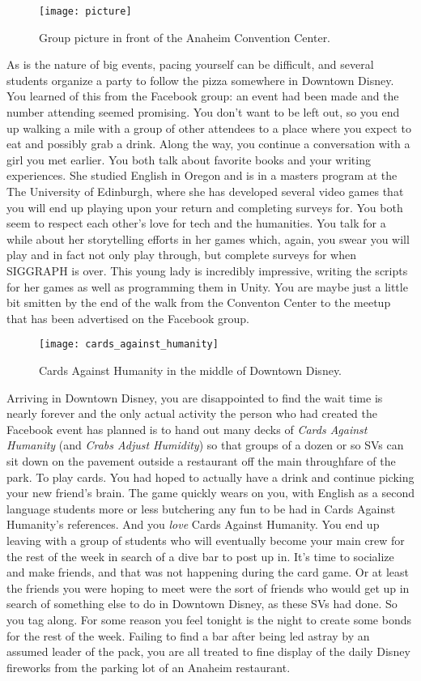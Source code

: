 \documentclass[../main.tex]{subfiles}
\begin{document}
\begin{figure}[h]
	\centering
	\texttt{[image: picture]}
	\caption*{Group picture in front of the Anaheim Convention Center.}
\end{figure}

As is the nature of big events, pacing yourself can be difficult, and several students organize a party to follow the pizza somewhere in Downtown Disney. You learned of this from the Facebook group: an event had been made and the number attending seemed promising. You don't want to be left out, so you end up walking a mile with a group of other attendees to a place where you expect to eat and possibly grab a drink. Along the way, you continue a conversation with a girl you met earlier. You both talk about favorite books and your writing experiences. She studied English in Oregon and is in a masters program at the The University of Edinburgh, where she has developed several video games that you will end up playing upon your return and completing surveys for. You both seem to respect each other's love for tech and the humanities. You talk for a while about her storytelling efforts in her games which, again, you swear you will play and in fact not only play through, but complete surveys for when SIGGRAPH is over. This young lady is incredibly impressive, writing the scripts for her games as well as programming them in Unity. You are maybe just a little bit smitten by the end of the walk from the Conventon Center to the meetup that has been advertised on the Facebook group.

\begin{figure}[h]
	\centering
	\texttt{[image: cards\_against\_humanity]}
	\caption*{Cards Against Humanity in the middle of Downtown Disney.}
\end{figure}

Arriving in Downtown Disney, you are disappointed to find the wait time is nearly forever and the only actual activity the person who had created the Facebook event has planned is to hand out many decks of \textit{Cards Against Humanity} (and \textit{Crabs Adjust Humidity}) so that groups of a dozen or so SVs can sit down on the pavement outside a restaurant off the main throughfare of the park. To play cards. You had hoped to actually have a drink and continue picking your new friend's brain. The game quickly wears on you, with English as a second language students more or less butchering any fun to be had in Cards Against Humanity's references. And you \textit{love} Cards Against Humanity. You end up leaving with a group of students who will eventually become your main crew for the rest of the week in search of a dive bar to post up in. It's time to socialize and make friends, and that was not happening during the card game. Or at least the friends you were hoping to meet were the sort of friends who would get up in search of something else to do in Downtown Disney, as these SVs had done. So you tag along. For some reason you feel tonight is the night to create some bonds for the rest of the week. Failing to find a bar after being led astray by an assumed leader of the pack, you are all treated to fine display of the daily Disney fireworks from the parking lot of an Anaheim restaurant.
\end{document}
